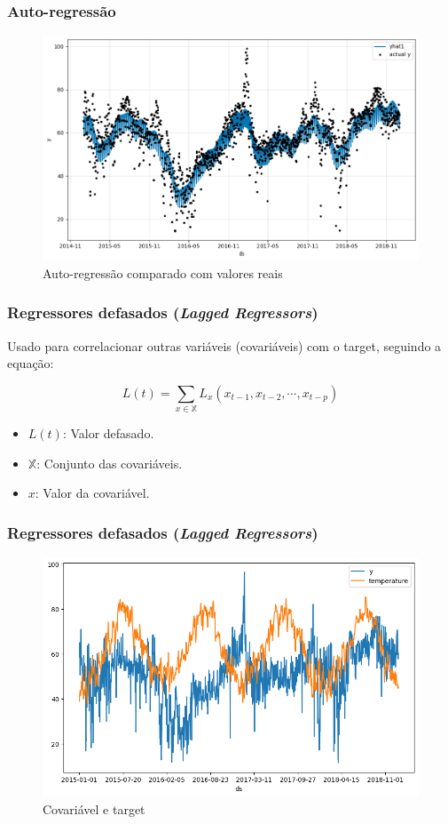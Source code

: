 \documentclass{beamer}
\begin{document}
\begin{frame}
\frametitle{Auto-regressão}

\begin{figure}
    \centering
    \includegraphics[width=0.8\linewidth]{auto-regressao.png}
    \caption{Auto-regressão comparado com valores reais}
\end{figure}
\end{frame}


\begin{frame}
\frametitle{Regressores defasados (\textit{Lagged Regressors})}
Usado para correlacionar outras variáveis (covariáveis) com o target, seguindo a equação:

\begin{equation}
    L(t) = \sum_{x \in \mathbb{X}} L_x (x_{t-1}, x_{t-2}, \cdots, x_{t-p})
\end{equation}
\begin{itemize}
    \item $L(t)$: Valor defasado.
    \item $\mathbb{X}$: Conjunto das covariáveis.
    \item $x$: Valor da covariável.
\end{itemize}
\end{frame}


\begin{frame}
\frametitle{Regressores defasados (\textit{Lagged Regressors})}
\begin{figure}
    \centering
    \includegraphics[width=0.7\linewidth]{regressores-defasados.png}
    \caption{Covariável e target}
\end{figure}
\end{frame}
\end{document}
